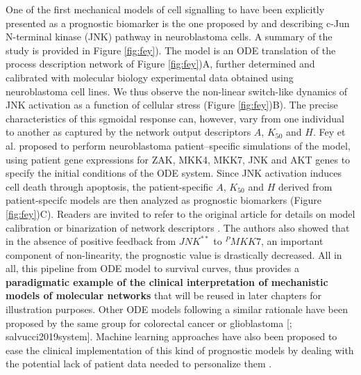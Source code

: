 \documentclass[a4paper,12pt,twoside,onecolumn,openright,final,oldfontcommands]{memoir}
\begin{document}
One of the first mechanical models of cell signalling to have been
explicitly presented as a prognostic biomarker is the one proposed by
\citet{fey2015signaling} and describing c-Jun N-terminal kinase (JNK)
pathway in neuroblastoma cells. A summary of the study is provided in
Figure \ref{fig:fey}). The model is an ODE translation of the process
description network of Figure \ref{fig:fey})A, further determined and
calibrated with molecular biology experimental data obtained using
neuroblastoma cell lines. We thus observe the non-linear switch-like
dynamics of JNK activation as a function of cellular stress (Figure
\ref{fig:fey})B). The precise characteristics of this sgmoidal response
can, however, vary from one individual to another as captured by the
network output descriptors \(A\), \(K_{50}\) and \(H\). Fey et al.
proposed to perform neuroblastoma patient--specific simulations of the
model, using patient gene expressions for ZAK, MKK4, MKK7, JNK and AKT
genes to specify the initial conditions of the ODE system. Since JNK
activation induces cell death through apoptosis, the patient-specific
\(A\), \(K_{50}\) and \(H\) derived from patient-specifc models are then
analyzed as prognostic biomarkers (Figure \ref{fig:fey})C). Readers are
invited to refer to the original article for details on model
calibration or binarization of network descriptors
\citep{fey2015signaling}. The authors also showed that in the absence of
positive feedback from \(JNK^{**}\) to \(^PMKK7\), an important
component of non-linearity, the prognostic value is drastically
decreased. All in all, this pipeline from ODE model to survival curves,
thus provides a \textbf{paradigmatic example of the clinical
interpretation of mechanistic models of molecular networks} that will be
reused in later chapters for illustration purposes. Other ODE models
following a similar rationale have been proposed by the same group for
colorectal cancer \citep{hector2012clinical, salvucci2017stepwise} or
glioblastoma {[}\citet{murphy2013activation}; salvucci2019system{]}.
Machine learning approaches have also been proposed to ease the clinical
implementation of this kind of prognostic models by dealing with the
potential lack of patient data needed to personalize them
\citep{salvucci2019machine}.
\end{document}
